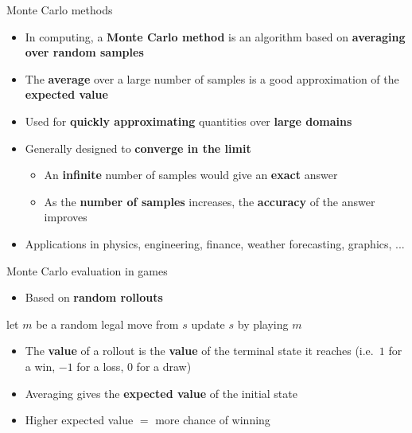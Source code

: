 \begin{frame}{Monte Carlo methods}
	\begin{itemize}
		\pause\item In computing, a \textbf{Monte Carlo method} is an algorithm based on \textbf{averaging over random samples}
		\pause\item The \textbf{average} over a large number of samples is a good approximation of the \textbf{expected value}
		\pause\item Used for \textbf{quickly approximating} quantities over \textbf{large domains}
		\pause\item Generally designed to \textbf{converge in the limit}
			\begin{itemize}
				\pause\item An \textbf{infinite} number of samples would give an \textbf{exact} answer
				\pause\item As the \textbf{number of samples} increases, the \textbf{accuracy} of the answer improves
			\end{itemize}
		\pause\item Applications in physics, engineering, finance, weather forecasting, graphics, ...
	\end{itemize}
\end{frame}

\begin{frame}{Monte Carlo evaluation in games}
	\begin{itemize}
		\pause\item Based on \textbf{random rollouts}
	\end{itemize}
	\pause
	\begin{algorithmic}
			\State let $m$ be a random legal move from $s$
			\State update $s$ by playing $m$
		\EndWhile
	\end{algorithmic}
	\begin{itemize}
		\pause\item The \textbf{value} of a rollout is the \textbf{value} of the terminal state it reaches (i.e.\ $1$ for a win, $-1$ for a loss, $0$ for a draw)
		\pause\item Averaging gives the \textbf{expected value} of the initial state
		\pause\item Higher expected value $=$ more chance of winning
	\end{itemize}
\end{frame}

